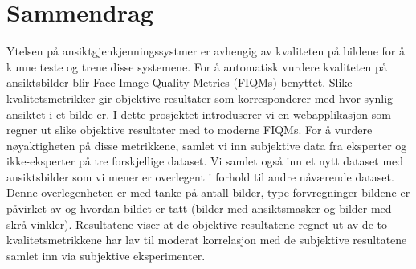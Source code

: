 \chapter*{Sammendrag}
Ytelsen på ansiktgjenkjenningssystmer er avhengig av kvaliteten på bildene for å kunne teste og trene disse systemene. For å automatisk vurdere kvaliteten på ansiktsbilder blir Face Image Quality Metrics (FIQMs) benyttet. Slike kvalitetsmetrikker gir objektive resultater som korresponderer med hvor synlig ansiktet i et bilde er. I dette prosjektet introduserer vi en webapplikasjon som regner ut slike objektive resultater med to moderne FIQMs. For å vurdere nøyaktigheten på disse metrikkene, samlet vi inn subjektive data fra eksperter og ikke-eksperter på tre forskjellige dataset. Vi samlet også inn et nytt dataset med ansiktsbilder som vi mener er overlegent i forhold til andre nåværende dataset. Denne overlegenheten er med tanke på antall bilder, type forvregninger bildene er påvirket av og hvordan bildet er tatt (bilder med ansiktsmasker og bilder med skrå vinkler). Resultatene viser at de objektive resultatene regnet ut av de to kvalitetsmetrikkene har lav til moderat korrelasjon med de subjektive resultatene samlet inn via subjektive eksperimenter. 
